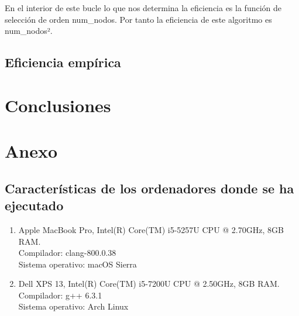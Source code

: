 \documentclass[11pt]{article}
\begin{document}
En el interior de este bucle lo que nos determina la eficiencia es la función de selección de orden num\_nodos. Por tanto la eficiencia de este algoritmo es num\_nodos².


\subsection*{Eficiencia empírica}



\section*{Conclusiones}


\newpage

\section*{Anexo}
\subsection*{Características de los ordenadores donde se ha ejecutado}

\vspace{0.5em}

\begin{enumerate}
\item Apple MacBook Pro, Intel(R) Core(TM) i5-5257U CPU @ 2.70GHz, 8GB RAM.\\  Compilador: clang-800.0.38 \\
  Sistema operativo: macOS Sierra
\item Dell XPS 13, Intel(R) Core(TM) i5-7200U CPU @ 2.50GHz, 8GB RAM.\\
  Compilador: g++ 6.3.1\\
  Sistema operativo: Arch Linux
\end{enumerate}
\end{document}
